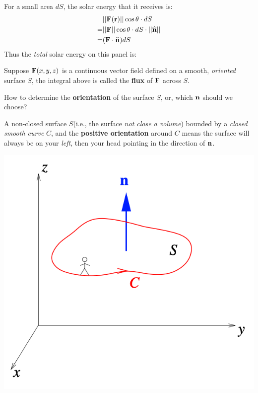 \documentclass[11pt, a4paper]{MATH2023}
\newcommand{\rr}{{\bf r}}
\newcommand{\FF}{{\bf F}}
\begin{document}
\begin{spacing}{1.3}
    \newcommand{\nm}{\widehat{\bf{n}}}
    For a small area $dS$, the solar energy that it receives is:
    \begin{align*}
        &||\FF(\rr)||\cos\theta\cdot dS \\
        =& ||\FF||\cos\theta\cdot dS\cdot ||\nm||\\
        =& (\FF\cdot \nm) dS
    \end{align*}
    Thus the {\it total} solar energy on this panel is: 
    \begin{center}
        \boxed{$$\disp \iint_S (\FF\cdot \nm) dS$$}
    \end{center}
    Suppose $\FF(x,y,z)$ is a continuous vector field defined on a smooth, {\it oriented}
    surface $S$, the integral above is called the {\bf flux} of $\FF$ across $S$.

    \vspace{0.4in}
    How to determine the {\bf orientation} of the surface $S$, or, 
    which $\bf{n}$ should we choose?

    A non-closed surface $S$(i.e., the surface {\it not close a volume}) bounded by 
    a {\it closed smooth curve }$C$, and the {\bf positive orientation} around $C$ means 
    the surface will always be on your {\it left}, then your head pointing in the direction of $\bf{n}$.
    \begin{center}
        \includegraphics[scale=0.43]{images/Ch15-oriented-surf.png}
    \end{center}


\end{spacing}
\end{document}
